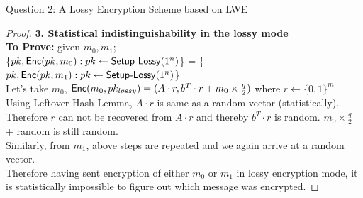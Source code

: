 \begin{solution}{Question 2: A Lossy Encryption Scheme based on LWE}
\begin{proof}
     
    \textbf{3. Statistical indistinguishability in the lossy mode}\\
    \textbf{To Prove:} given $m_0, m_1$;\\ \{$pk, \mathsf{Enc}(pk,m_0) : pk\leftarrow\mathsf{Setup\text{-}Lossy}(1^n)$\} = \{$pk, \mathsf{Enc}(pk,m_1) : pk\leftarrow\mathsf{Setup\text{-}Lossy}(1^n)$\}\\
    Let's take $m_0$, $\mathsf{Enc}(m_0, pk_{lossy}) = (A\cdot r, b^T\cdot r+m_0\times\frac{q}{2})$ where $r\leftarrow\{0,1\}^m$\\
    Using Leftover Hash Lemma, $A\cdot r$ is same as a random vector (statistically). Therefore $r$ can not be recovered from $A\cdot r$ and thereby $b^T\cdot r$ is random. $m_0\times\frac{q}{2}$ + random is still random.\\
    Similarly, from $m_1$, above steps are repeated and we again arrive at a random vector.\\
    Therefore having sent encryption of either $m_0$ or $m_1$ in lossy encryption mode, it is statistically impossible to figure out which message was encrypted.
    



    
    \end{proof}
\end{solution}
